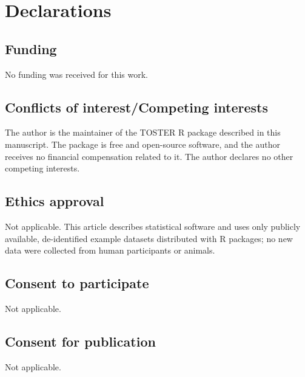 \documentclass[]{interact}
\theoremstyle{plain}%
\theoremstyle{definition}
\theoremstyle{remark}
\begin{document}
\section*{Declarations}\label{declarations}

\subsection*{Funding}\label{funding}

No funding was received for this work.

\subsection*{Conflicts of interest/Competing
interests}\label{conflicts-of-interestcompeting-interests}

The author is the maintainer of the TOSTER R package described in this
manuscript. The package is free and open-source software, and the author
receives no financial compensation related to it. The author declares no
other competing interests.

\subsection*{Ethics approval}\label{ethics-approval}

Not applicable. This article describes statistical software and uses
only publicly available, de-identified example datasets distributed with
R packages; no new data were collected from human participants or
animals.

\subsection*{Consent to participate}\label{consent-to-participate}

Not applicable.

\subsection*{Consent for publication}\label{consent-for-publication}

Not applicable.
\end{document}
